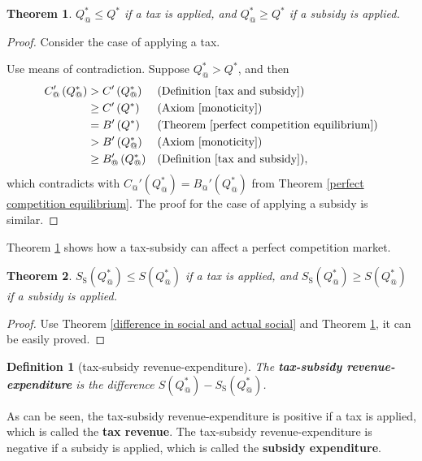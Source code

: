 \documentclass{article}
\newtheorem{theorem}{Theorem}[subsection]
\newtheorem{definition}{Definition}[subsection]
\begin{document}
\begin{theorem}
\label{effect of tax and subsidy}
$Q_@^*\le Q^*$ if a tax is applied, and $Q_@^*\ge Q^*$ if a subsidy is applied.
\end{theorem}
\begin{proof}
Consider the case of applying a tax.

Use means of contradiction.
Suppose $Q_@^*>Q^*$, and then
\begin{align*}
C_@'\left(Q_@^*\right)&>C'\left(Q_@^*\right)&&\text{(Definition \ref{tax and subsidy})}\\
&\ge C'\left(Q^*\right)&&\text{(Axiom \ref{monoticity})}\\
&=B'\left(Q^*\right)&&\text{(Theorem \ref{perfect competition equilibrium})}\\\
&>B'\left(Q_@^*\right)&&\text{(Axiom \ref{monoticity})}\\
&\ge B_@'\left(Q_@^*\right)&&\text{(Definition \ref{tax and subsidy})},
\end{align*}
which contradicts with $C_@'\left(Q_@^*\right)=B_@'\left(Q_@^*\right)$ from Theorem \ref{perfect competition equilibrium}.
The proof for the case of applying a subsidy is similar.
\end{proof}

Theorem \ref{effect of tax and subsidy} shows how a tax-subsidy can affect a perfect competition market.

\begin{theorem}
$S_\mathrm S\left(Q_@^*\right)\le S\left(Q_@^*\right)$ if a tax is applied, and $S_\mathrm S\left(Q_@^*\right)\ge S\left(Q_@^*\right)$ if a subsidy is applied.
\end{theorem}
\begin{proof}
Use Theorem \ref{difference in social and actual social} and Theorem \ref{effect of tax and subsidy}, it can be easily proved.
\end{proof}

\begin{definition}[tax-subsidy revenue-expenditure]
The \textbf{tax-subsidy revenue-expenditure} is the difference $S\left(Q_@^*\right)-S_\mathrm S\left(Q_@^*\right)$.
\end{definition}

As can be seen, the tax-subsidy revenue-expenditure is positive if a tax is applied, which is called the \textbf{tax revenue}.
The tax-subsidy revenue-expenditure is negative if a subsidy is applied, which is called the \textbf{subsidy expenditure}.
\end{document}
